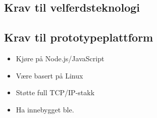 \subsection{Krav til velferdsteknologi}
\subsection{Krav til prototypeplattform}

\begin{itemize}
    \item Kjøre på Node.js/JavaScript
    \item Være basert på Linux
    \item Støtte full TCP/IP-stakk
    \item Ha innebygget \gls{ble}.
\end{itemize}


